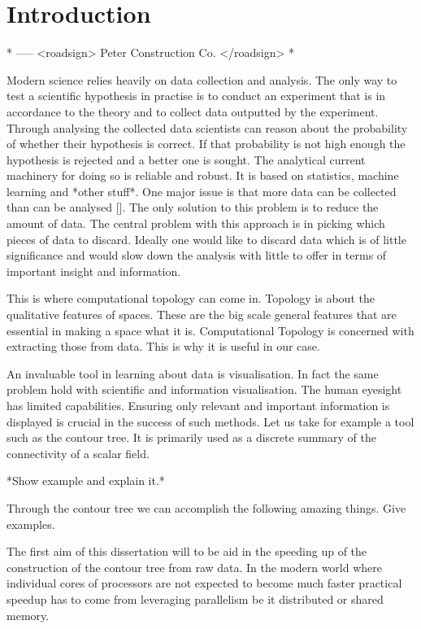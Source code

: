 \chapter{Introduction}
\label{chapter2}

* ----- <roadsign> Peter Construction Co. </roadsign> *

Modern science relies heavily on data collection and analysis. The only way to test a scientific hypothesis in practise is to conduct an experiment that is in accordance to the theory and to collect data outputted by the experiment. Through analysing the collected data scientists can reason about the probability of whether their hypothesis is correct. If that probability is not high enough the hypothesis is rejected and a better one is sought. The analytical current machinery for doing so is reliable and robust. It is based on statistics, machine learning and *other stuff*. One major issue is that more data can be collected than can be analysed []. The only solution to this problem is to reduce the amount of data. The central problem with this approach is in picking which pieces of data to discard. Ideally one would like to discard data which is of little significance and would slow down the analysis with little to offer in terms of important insight and information.

This is where computational topology can come in. Topology is about the qualitative features of spaces. These are the big scale general features that are essential in making a space what it is. Computational Topology is concerned with extracting those from data. This is why it is useful in our case.

An invaluable tool in learning about data is visualisation. In fact the same problem hold with scientific and information visualisation. The human eyesight has limited capabilities. Ensuring only relevant and important information is displayed is crucial in the success of such methods. Let us take for example a tool such as the contour tree. It is primarily used as a discrete summary of the connectivity of a scalar field.

*Show example and explain it.*

Through the contour tree we can accomplish the following amazing things. Give examples.

The first aim of this dissertation will to be aid in the speeding up of the construction of the contour tree from raw data. In the modern world where individual cores of processors are not expected to become much faster practical speedup has to come from leveraging parallelism be it distributed or shared memory. 

